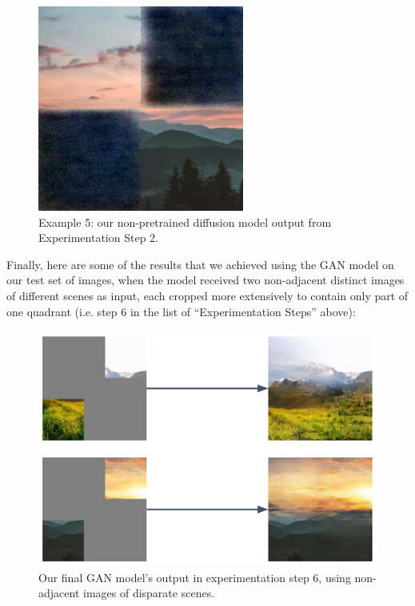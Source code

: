 \documentclass[sigconf]{acmart}
\begin{document}
\begin{figure}[h!]
    \centering
    \includegraphics[width=\linewidth]{diffusion_step_2_5}
    \caption{Example 5: our non-pretrained diffusion model output from Experimentation Step 2.}
    \label{fig:diffusion_step_2_5}
\end{figure}

Finally, here are some of the results that we achieved using the GAN model on our test set of images, when the model received two non-adjacent distinct images of different scenes as input, each cropped more extensively to contain only part of one quadrant (i.e. step 6 in the list of “Experimentation Steps” above):

\begin{figure}[h!]
    \centering
    \includegraphics[width=\linewidth]{gan_step_6}
    \caption{Our final GAN model's output in experimentation step 6, using non-adjacent images of disparate scenes.}
    \label{fig:gan_step_6}
\end{figure}
\end{document}
